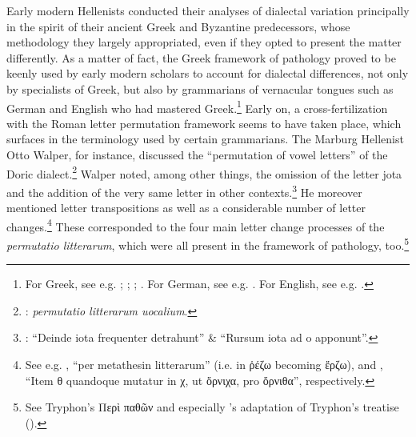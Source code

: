 Early modern Hellenists conducted their analyses of dialectal variation principally in the spirit of their ancient Greek and Byzantine predecessors, whose methodology they largely appropriated, even if they opted to present the matter differently. As a matter of fact, the Greek framework of pathology proved to be keenly used by early modern scholars to account for dialectal differences, not only by specialists of Greek, but also by grammarians of vernacular tongues such as German and English who had mastered Greek.\footnote{{For Greek, see e.g. \citet[b.iv\textsc{\textsuperscript{v}}]{Melanchthon1518}; \citet[{7}{\textsc{\textsuperscript{v}}}{–11}{\textsc{\textsuperscript{v}}}]{Baile1588}; \citet[11]{Schmidt1604}; \citet[2–8, 20–22]{Hill1658}. For German, see e.g. \citet{Wolf1578}. For English, see e.g. \citet[130--133]{Gill1619}.}} Early on, a cross-fertilization with the Roman letter permutation framework seems to have taken place, which surfaces in the terminology used by certain grammarians. The Marburg Hellenist Otto Walper, for instance, discussed the “permutation of vowel letters” of the Doric dialect.\footnote{{\citet[62]{Walper1589}:} {\textit{permutatio litterarum uocalium}}.} Walper noted, among other things, the omission of the letter jota and the addition of the very same letter in other contexts.\footnote{{\citet[63]{Walper1589}: “Deinde iota frequenter detrahunt” \& “Rursum iota ad o apponunt”.}} He moreover mentioned letter transpositions as well as a considerable number of letter changes.\footnote{{See e.g. \citet[63]{Walper1589}, “per metathesin litterarum” (i.e. in ῥέζω becoming ἔρζω), and \citet[64]{Walper1589}, “Item θ quandoque mutatur in χ, ut ὄρνιχα, pro ὄρνιθα”, respectively.}} These corresponded to the four main letter change processes of the \textit{permutatio litterarum}, which were all present in the framework of pathology, too.\footnote{{See Tryphon’s Περὶ παθῶν and especially \citeauthor{Amerot1520}'s adaptation of Tryphon’s  treatise  (\citeyear[\textsc{p.}{iv}{\textsc{\textsuperscript{v}}}]{Amerot1520}).}}

